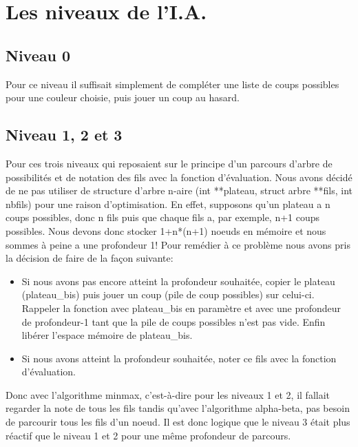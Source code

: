 \documentclass[a4paper, 11pt]{article}
\begin{document}
\section{Les niveaux de l'I.A.}
\subsection{Niveau 0}
Pour ce niveau il suffisait simplement de compléter une liste de coups possibles pour une couleur choisie, puis jouer un coup au hasard.
\subsection{Niveau 1, 2 et 3}
Pour ces trois niveaux qui reposaient sur le principe d'un parcours d'arbre de possibilités et de notation des fils avec la fonction d'évaluation. Nous avons décidé de ne pas utiliser de structure d'arbre n-aire (int **plateau, struct arbre **fils, int nbfils) pour une raison d'optimisation.
\newline
En effet, supposons qu'un plateau a n coups possibles, donc n fils puis que chaque fils a, par exemple, n+1 coups possibles. Nous devons donc stocker 1+n*(n+1) noeuds en mémoire et nous sommes à peine a une profondeur 1!
\newline
Pour remédier à ce problème nous avons pris la décision de faire de la façon suivante:
\begin{itemize}
\item Si nous avons pas encore atteint la profondeur souhaitée, copier le plateau (plateau\_bis) puis jouer un coup (pile de coup possibles) sur celui-ci. Rappeler la fonction avec plateau\_bis en paramètre et avec une profondeur de profondeur-1 tant que la pile de coups possibles n'est pas vide. Enfin libérer l'espace mémoire de plateau\_bis.
\item Si nous avons atteint la profondeur souhaitée, noter ce fils avec la fonction d'évaluation.
\end{itemize}
Donc avec l'algorithme minmax, c'est-à-dire pour les niveaux 1 et 2, il fallait regarder la note de tous les fils tandis qu'avec l'algorithme alpha-beta, pas besoin de parcourir tous les fils d'un noeud. Il est donc logique que le niveau 3 était plus réactif que le niveau 1 et 2 pour une même profondeur de parcours.
\end{document}
